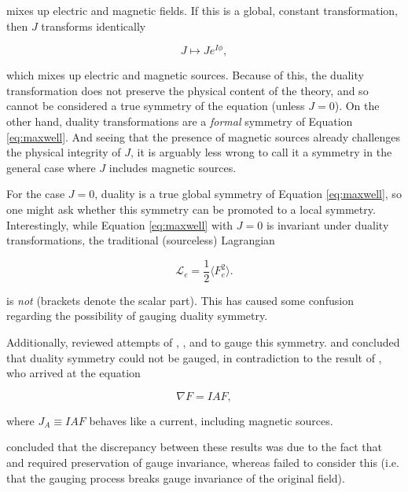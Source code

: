 \documentclass{article}
\begin{document}
  mixes up electric and magnetic fields. If this is a global, constant transformation, then $J$ transforms identically

  \begin{equation}
    J \mapsto J e^{I \phi},
  \end{equation}

  which mixes up electric and magnetic sources. Because of this, the duality transformation does not preserve the physical content of the theory, and so cannot be considered a true symmetry of the equation (unless $J=0$). On the other hand, duality transformations are a \emph{formal} symmetry of Equation \ref{eq:maxwell}. And seeing that the presence of magnetic sources already challenges the physical integrity of $J$, it is arguably less wrong to call it a symmetry in the general case where $J$ includes magnetic sources.

  For the case $J=0$, duality is a true global symmetry of Equation \ref{eq:maxwell}, so one might ask whether this symmetry can be promoted to a local symmetry. Interestingly, while Equation \ref{eq:maxwell} with $J=0$ is invariant under duality transformations, the traditional (sourceless) Lagrangian

  \begin{equation}
    \mathcal{L}_e = \frac{1}{2} \langle F_e^2 \rangle.\label{eq:elagrangian}
  \end{equation}

  is \emph{not} (brackets denote the scalar part). This has caused some confusion regarding the possibility of gauging duality symmetry. 

  Additionally, \cite{saa} reviewed attempts of \cite{malik}, \cite{bunster}, and \cite{deser} to gauge this symmetry. \cite{bunster} and \cite{deser} concluded that duality symmetry could not be gauged, in contradiction to the result of \cite{malik}, who arrived at the equation

  \begin{equation}
    \nabla F = I A F,\label{eq:malik}
  \end{equation}

  where $J_A \equiv IAF$ behaves like a current, including magnetic sources.

  \cite{saa} concluded that the discrepancy between these results was due to the fact that \cite{bunster} and \cite{deser} required preservation of gauge invariance, whereas \cite{malik} failed to consider this (i.e. that the gauging process breaks gauge invariance of the original field).  
\end{document}
